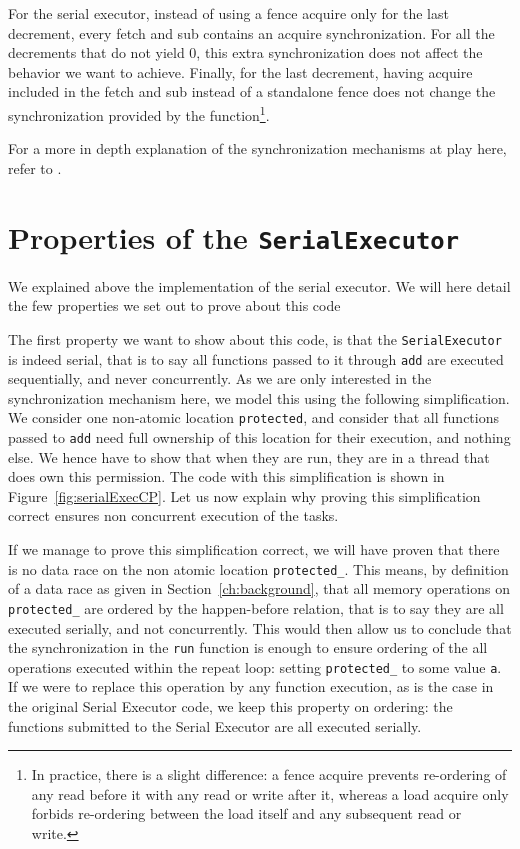 For the serial executor, instead of using a fence acquire only for the last decrement, every fetch and sub contains an acquire synchronization. For all the decrements that do not yield 0, this extra synchronization does not affect the behavior we want to achieve. Finally, for the last decrement, having acquire included in the fetch and sub instead of a standalone fence does not change the synchronization provided by the function\footnote{In practice, there is a slight difference: a fence acquire prevents re-ordering of any read before it with any read or write after it, whereas a load acquire only forbids re-ordering between the load itself and any subsequent read or write.}.

For a more in depth explanation of the synchronization mechanisms at play here, refer to \cite{fsl}.


\section{Properties of the \texttt{SerialExecutor}}
We explained above the implementation of the serial executor. We will here detail the few properties we set out to prove about this code

The first property we want to show about this code, is that the \texttt{Serial\-Executor} is indeed serial, that is to say all functions passed to it through \texttt{add} are executed sequentially, and never concurrently. As we are only interested in the synchronization mechanism here, we model this using the following simplification. We consider one non-atomic location \texttt{protected}, and consider that all functions passed to \texttt{add} need full ownership of this location for their execution, and nothing else. We hence have to show that when they are run, they are in a thread that does own this permission. The code with this simplification is shown in Figure~\ref{fig:serialExecCP}. Let us now explain why proving this simplification correct ensures non concurrent execution of the tasks. 

If we manage to prove this simplification correct, we will have proven that there is no data race on the non atomic location \texttt{protected\_}. This means, by definition of a data race as given in Section~\ref{ch:background}, that all memory operations on \texttt{protected\_} are ordered by the happen-before relation, that is to say they are all executed serially, and not concurrently. This would then allow us to conclude that the synchronization in the \texttt{run} function is enough to ensure ordering of the all operations executed within the repeat loop: setting \texttt{protected\_} to some value \texttt{a}. If we were to replace this operation by any function execution, as is the case in the original Serial Executor code, we keep this property on ordering: the functions submitted to the Serial Executor are all executed serially. 

